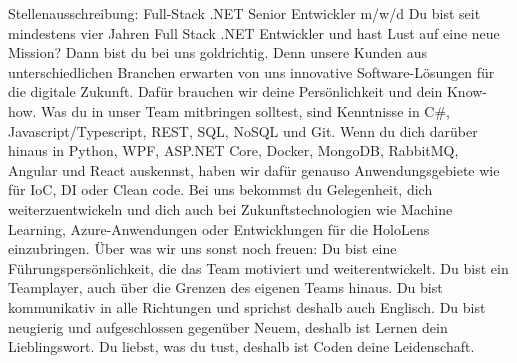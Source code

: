 Stellenausschreibung: Full-Stack .NET Senior Entwickler m/w/d  
Du bist seit mindestens vier Jahren Full Stack .NET Entwickler und hast Lust auf eine neue Mission? Dann bist du bei uns goldrichtig. Denn unsere Kunden aus unterschiedlichen Branchen erwarten von uns innovative Software-Lösungen für die digitale Zukunft. Dafür brauchen wir deine Persönlichkeit und dein Know-how.  
Was du in unser Team mitbringen solltest, sind Kenntnisse in C\#, Javascript/Typescript, REST, SQL, NoSQL und Git. Wenn du dich darüber hinaus in Python, WPF, ASP.NET Core, Docker, MongoDB, RabbitMQ, Angular und React auskennst, haben wir dafür genauso Anwendungsgebiete wie für IoC, DI oder Clean code.  
Bei uns bekommst du Gelegenheit, dich weiterzuentwickeln und dich auch bei Zukunftstechnologien wie Machine Learning, Azure-Anwendungen oder Entwicklungen für die HoloLens einzubringen.  
Über was wir uns sonst noch freuen:  
Du bist eine Führungspersönlichkeit, die das Team motiviert und weiterentwickelt.  
Du bist ein Teamplayer, auch über die Grenzen des eigenen Teams hinaus.  
Du bist kommunikativ in alle Richtungen und sprichst deshalb auch Englisch.  
Du bist neugierig und aufgeschlossen gegenüber Neuem, deshalb ist Lernen dein Lieblingswort.  
Du liebst, was du tust, deshalb ist Coden deine Leidenschaft.
